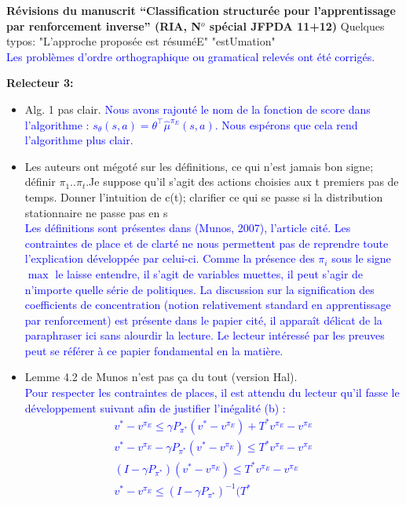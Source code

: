 \documentclass[11pt, a4paper]{letter}
\begin{document}
\begin{letter}{\large \textbf{Révisions du manuscrit ``Classification structurée pour l'apprentissage par renforcement inverse'' (RIA, N$^o$ spécial JFPDA 11+12)}}
  Quelques typos:
"L'approche proposée est résuméE"
"estUmation"\\
  \textcolor{blue}{Les problèmes d'ordre orthographique ou gramatical relevés ont été corrigés.}
\vspace{.5cm}
\newpage
\begin{large} \textbf{Relecteur 3:} \\ \end{large}
\begin{itemize}
\item Alg. 1 pas clair.
\textcolor{blue}{Nous avons rajouté le nom de la fonction de score dans l'algorithme :  $s_\theta(s,a) = \theta^\top\hat{\mu}^{\pi_E}(s,a)$. Nous espérons que cela rend l'algorithme plus clair.}
\item Les auteurs ont mégoté sur les définitions, ce qui n'est jamais bon signe; définir $\pi_1..\pi_t$.Je suppose qu'il s'agit des actions choisies aux t premiers pas de temps.
Donner l'intuition de c(t); clarifier ce qui se passe si la distribution stationnaire ne passe pas en s\\
\textcolor{blue}{Les définitions sont présentes dans (Munos, 2007), l'article cité. Les contraintes de place et de clarté ne nous permettent pas de reprendre toute l'explication développée par celui-ci. Comme la présence des $\pi_i$ sous le signe $\max$ le laisse entendre, il s'agit de variables muettes, il peut s'agir de n'importe quelle série de politiques. La discussion sur la signification des coefficients de concentration (notion relativement standard en apprentissage par renforcement) est présente dans le papier cité, il apparaît délicat de la paraphraser ici sans alourdir la lecture. Le lecteur intéressé par les preuves peut se référer à ce papier fondamental en la matière.}
\item Lemme 4.2 de Munos n'est pas ça du tout (version Hal).\\
\textcolor{blue}{Pour respecter les contraintes de places, il est attendu du lecteur qu'il fasse le développement suivant afin de justifier l'inégalité (b) :
\begin{eqnarray}
  v^{*} - v^{\pi_E} \leq \gamma P_{\pi^*}(v^*-v^{\pi_E}) + T^*
    v^{\pi_E} - v^{\pi_E}\\
    v^{*} - v^{\pi_E} - \gamma P_{\pi^*}(v^*-v^{\pi_E}) \leq T^*
    v^{\pi_E} - v^{\pi_E}\\
    (I- \gamma P_{\pi^*})(v^*-v^{\pi_E}) \leq T^*
    v^{\pi_E} - v^{\pi_E}\\
    v^*-v^{\pi_E} \leq (I- \gamma P_{\pi^*}) ^{-1}(T^*

\end{eqnarray}}
\end{itemize}
\end{letter}
\end{document}
